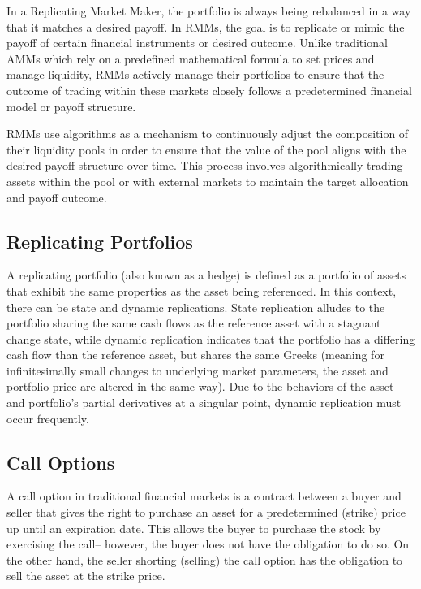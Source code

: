 \documentclass[12pt]{article}
\begin{document}
In a Replicating Market Maker, the portfolio is always being rebalanced in a way that it matches a desired payoff. In RMMs, the goal is to replicate or mimic the payoff of certain financial instruments or desired outcome. Unlike traditional AMMs which rely on a predefined mathematical formula to set prices and manage liquidity, RMMs actively manage their portfolios to ensure that the outcome of trading within these markets closely follows a predetermined financial model or payoff structure.

RMMs use algorithms as a mechanism to continuously adjust the composition of their liquidity pools in order to ensure that the value of the pool aligns with the desired payoff structure over time. This process involves algorithmically trading assets within the pool or with external markets to maintain the target allocation and payoff outcome.

\subsection{Replicating Portfolios}

A replicating portfolio (also known as a hedge) is defined as a portfolio of assets that exhibit the same properties as the asset being referenced. In this context, there can be state and dynamic replications. State replication alludes to the portfolio sharing the same cash flows as the reference asset with a stagnant change state, while dynamic replication indicates that the portfolio has a differing cash flow than the reference asset,  but shares the same Greeks (meaning for infinitesimally small changes to underlying market parameters, the asset and portfolio price are altered in the same way). Due to the behaviors of the asset and portfolio’s partial derivatives at a singular point, dynamic replication must occur frequently.

\subsection{Call Options}
A call option in traditional financial markets is a contract between a buyer and seller that gives the right to purchase an asset for a predetermined (strike) price up until an expiration date. This allows the buyer to purchase the stock by exercising the call– however, the buyer does not have the obligation to do so. On the other hand, the seller shorting (selling) the call option has the obligation to sell the asset at the strike price. 
\end{document}
